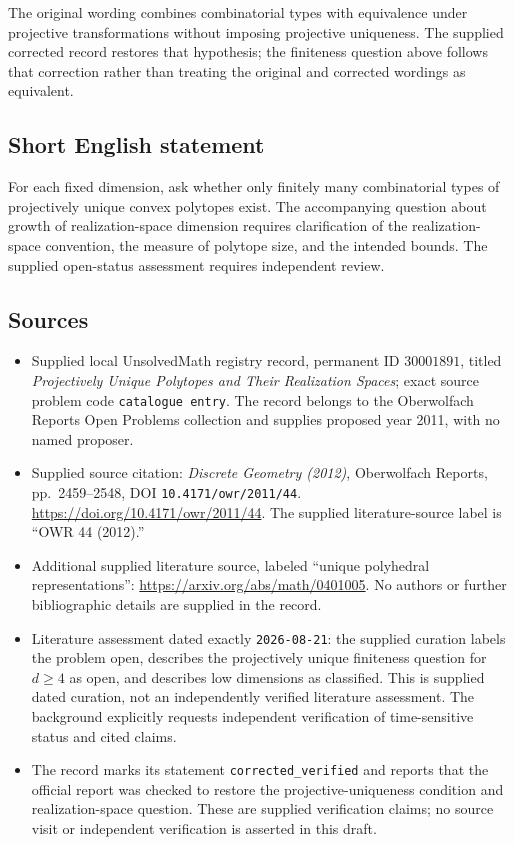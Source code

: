 \documentclass[11pt]{article}
\begin{document}
The original wording combines combinatorial types with equivalence under projective transformations without imposing projective uniqueness. The supplied corrected record restores that hypothesis; the finiteness question above follows that correction rather than treating the original and corrected wordings as equivalent.
\subsection{Short English statement}
For each fixed dimension, ask whether only finitely many combinatorial types of projectively unique convex polytopes exist. The accompanying question about growth of realization-space dimension requires clarification of the realization-space convention, the measure of polytope size, and the intended bounds. The supplied open-status assessment requires independent review.
\subsection{Sources}
\begin{itemize}
\item Supplied local UnsolvedMath registry record, permanent ID \(30001891\), titled \emph{Projectively Unique Polytopes and Their Realization Spaces}; exact source problem code \texttt{catalogue entry}. The record belongs to the Oberwolfach Reports Open Problems collection and supplies proposed year 2011, with no named proposer.
\item Supplied source citation: \emph{Discrete Geometry (2012)}, Oberwolfach Reports, pp.~2459--2548, DOI \texttt{10.4171/owr/2011/44}. \url{https://doi.org/10.4171/owr/2011/44}. The supplied literature-source label is ``OWR 44 (2012).''
\item Additional supplied literature source, labeled ``unique polyhedral representations'': \url{https://arxiv.org/abs/math/0401005}. No authors or further bibliographic details are supplied in the record.
\item Literature assessment dated exactly \texttt{2026-08-21}: the supplied curation labels the problem open, describes the projectively unique finiteness question for \(d\geq4\) as open, and describes low dimensions as classified. This is supplied dated curation, not an independently verified literature assessment. The background explicitly requests independent verification of time-sensitive status and cited claims.
\item The record marks its statement \texttt{corrected\_verified} and reports that the official report was checked to restore the projective-uniqueness condition and realization-space question. These are supplied verification claims; no source visit or independent verification is asserted in this draft.
\end{itemize}
\end{document}
